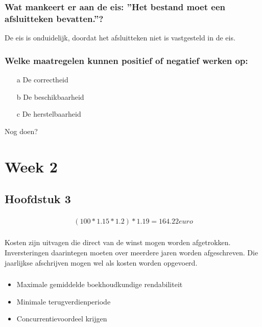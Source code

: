 \documentclass[a4paper,titlepage]{artikel1}
\begin{document}
   
   \subsubsection[Opdracht 9]{Wat mankeert er aan de eis: ''Het bestand moet een afsluitteken bevatten.''?}
   De eis is onduidelijk, doordat het afsluitteken niet is vastgesteld in de eis. 
   
   \subsubsection[Opdracht 10]{Welke maatregelen kunnen positief of negatief werken op:}
   \begin{itemize}
    \item[a] De correctheid
    \item[b] De beschikbaarheid
    \item[c] De herstelbaarheid
   \end{itemize}
   Nog doen?
   
 \section{Week 2}
  \subsection{Hoofdstuk 3}
   \subsubsection[Opdracht 1]{}
   \begin{displaymath}
    (100*1.15*1.2)*1.19={164.22}euro
   \end{displaymath}
   
   \subsubsection[Opdracht 2]{}
   Kosten zijn uitvagen die direct van de winst mogen worden afgetrokken. Inversteringen daarintegen moeten over meerdere jaren worden afgeschreven. Die jaarlijkse afschrijven mogen wel als kosten worden opgevoerd.
   
   \subsubsection[Opdracht 3]{}
   \begin{itemize}
    \item Maximale gemiddelde boekhoudkundige rendabiliteit
    \item Minimale terugverdienperiode
    \item Concurrentievoordeel krijgen
   \end{itemize}
\end{document}
